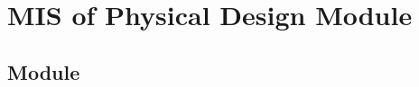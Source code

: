 \documentclass[12pt, titlepage]{article}
\begin{document}
%
%
%
%
%
%
%
%
%
%





\section{MIS of Physical Design Module} \label{mPD} 

\subsection{Module}
\end{document}
